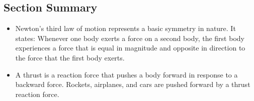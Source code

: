 \documentclass[
]{book}
\providecommand{\tightlist}{%
  \setlength{\itemsep}{0pt}\setlength{\parskip}{0pt}}
\begin{document}
\hypertarget{fs-id1446741-summary}{}
\hypertarget{section-summary-11}{%
\subsection{Section Summary}\label{section-summary-11}}

\begin{itemize}
\tightlist
\item
  {Newton's third law of motion} represents a basic
  symmetry in nature. It states: Whenever one body exerts a force on a
  second body, the first body experiences a force that is equal in
  magnitude and opposite in direction to the force that the first body
  exerts.
\item
  A {thrust} is a reaction force that pushes a body
  forward in response to a backward force. Rockets, airplanes, and
  cars are pushed forward by a thrust reaction force.
\end{itemize}
\end{document}
